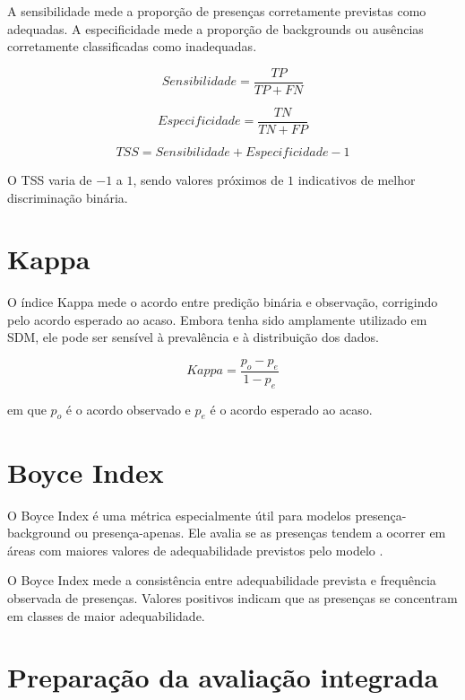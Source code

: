 A sensibilidade mede a proporção de presenças corretamente previstas como adequadas. A especificidade mede a proporção de backgrounds ou ausências corretamente classificadas como inadequadas.

\begin{equationbox}
	\[
	Sensibilidade = \frac{TP}{TP + FN}
	\]
	
	\[
	Especificidade = \frac{TN}{TN + FP}
	\]
	
	\[
	TSS = Sensibilidade + Especificidade - 1
	\]
\end{equationbox}

O TSS varia de \(-1\) a \(1\), sendo valores próximos de \(1\) indicativos de melhor discriminação binária.

\section{Kappa}

O índice Kappa mede o acordo entre predição binária e observação, corrigindo pelo acordo esperado ao acaso. Embora tenha sido amplamente utilizado em SDM, ele pode ser sensível à prevalência e à distribuição dos dados.

\begin{equationbox}
	\[
	Kappa = \frac{p_o - p_e}{1 - p_e}
	\]
\end{equationbox}

em que \(p_o\) é o acordo observado e \(p_e\) é o acordo esperado ao acaso.

\section{Boyce Index}

O Boyce Index é uma métrica especialmente útil para modelos presença-background ou presença-apenas. Ele avalia se as presenças tendem a ocorrer em áreas com maiores valores de adequabilidade previstos pelo modelo \parencite{hirzel2006evaluating}.

\begin{conceito}[title={\faBook\quad Boyce Index}]
	O Boyce Index mede a consistência entre adequabilidade prevista e frequência observada de presenças. Valores positivos indicam que as presenças se concentram em classes de maior adequabilidade.
\end{conceito}

\section{Preparação da avaliação integrada}

